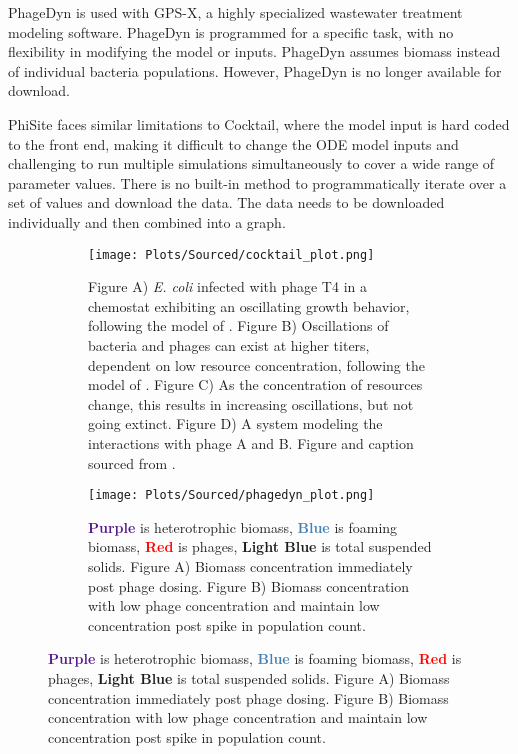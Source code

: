 PhageDyn is used with GPS-X, a highly specialized wastewater treatment modeling software. 
PhageDyn is programmed for a specific task, with no flexibility in modifying the model or inputs. 
PhageDyn assumes biomass instead of individual bacteria populations. 
However, PhageDyn is no longer available for download.

PhiSite faces similar limitations to Cocktail, where the model input is hard coded to the front end, making it difficult to change the ODE model inputs and challenging to run multiple simulations simultaneously to cover a wide range of parameter values. 
There is no built-in method to programmatically iterate over a set of values and download the data. 
The data needs to be downloaded individually and then combined into a graph. 

\begin{figure}
    \centering
    \begin{subfigure}{0.32\linewidth}
        \centering
        \captionsetup{width=1\linewidth}
        \texttt{[image: Plots/Sourced/cocktail\_plot.png]}
        \caption{
            Figure A) \textit{E. coli} infected with phage T4 in a chemostat exhibiting an oscillating growth behavior, following the model of \citet{bohannanEffectResourceEnrichment1997}. 
            Figure B) Oscillations of bacteria and phages can exist at higher titers, dependent on low resource concentration, following the model of \citet{lenskiDynamicsInteractionsBacteria1988}. 
            Figure C) As the concentration of resources change, this results in increasing oscillations, but not going extinct. 
            Figure D) A system modeling the interactions with phage A and B. 
            Figure and caption sourced from \citet{nilssonCocktailComputerProgram2022}. 
        }
        \label{fig:sourced:cocktail_plot}
    \end{subfigure}
    \hfill
    \begin{subfigure}{0.32\linewidth}
        \centering
        \captionsetup{width=1\linewidth}
        \texttt{[image: Plots/Sourced/phagedyn\_plot.png]}
        \caption{
            \textcolor[HTML]{551A8C}{\textbf{Purple}} is heterotrophic biomass, 
            \textcolor[HTML]{4580B4}{\textbf{Blue}} is foaming biomass, 
            \textcolor[HTML]{FF0000}{\textbf{Red}} is phages, 
            \textcolor[HTML]{01E6EE}{\textbf{Light Blue}} is total suspended solids. 
            Figure A) Biomass concentration immediately post phage dosing. 
            Figure B) Biomass concentration with low phage concentration and maintain low concentration post spike in population count. 
}
\end{subfigure}
\end{figure}
